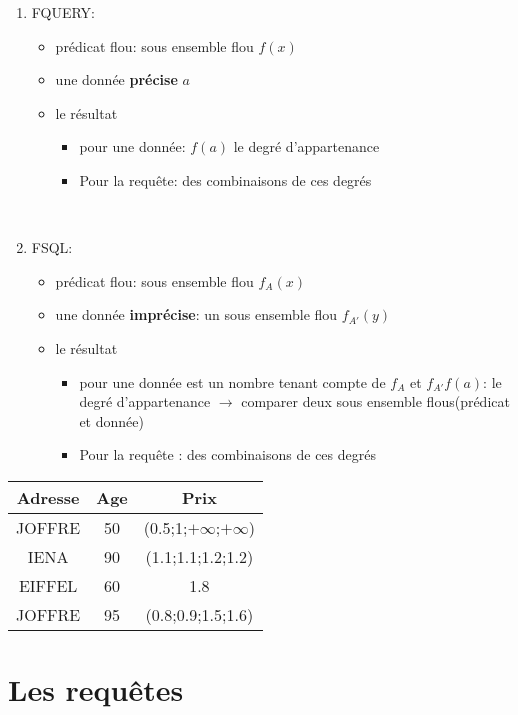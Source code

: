 \documentclass[a4paper,11pt]{article}
\begin{document}
\begin{enumerate}
\item FQUERY:
	\begin{itemize}
	\item prédicat flou: sous ensemble flou $f(x)$
	\item une donnée \textbf{précise} $a$
	\item le résultat
	\begin{itemize}
		\item pour une donnée: $f(a)$ le degré d’appartenance
		\item Pour la requête: des combinaisons de ces degrés
	\end{itemize}		
\end{itemize}
~

\item FSQL:
	\begin{itemize}
	\item prédicat flou: sous ensemble flou $f_A(x)$
	\item une donnée \textbf{imprécise}: un sous ensemble flou $f_{A'}(y)$
	\item le résultat
	\begin{itemize}
		\item pour une donnée est un nombre tenant compte de $f_A$ et $f_{A'} f(a)$: le degré d'appartenance $\rightarrow$ comparer deux sous ensemble flous(prédicat et donnée) 
		\item Pour la requête : des combinaisons de ces degrés
	\end{itemize}		
\end{itemize}
\end{enumerate}

\begin{center}
\begin{tabular}{|c|c|c|}
	\hline 
	\textbf{Adresse} & \textbf{Age} & \textbf{Prix} \\ 
	\hline 
	\hline
	JOFFRE & 50 & (0.5;1;$+\infty$;$+\infty$) \\ 
	\hline 
	IENA & 90 & (1.1;1.1;1.2;1.2) \\ 
	\hline 
	EIFFEL & 60 & 1.8 \\ 
	\hline 
	JOFFRE & 95 & (0.8;0.9;1.5;1.6) \\ 
	\hline 
\end{tabular} 
\end{center}

\section{Les requêtes}
\end{document}

